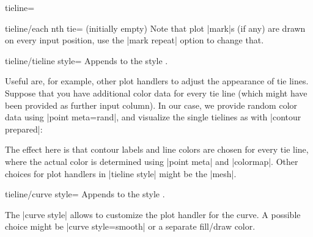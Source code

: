 \begin{plottype}{tieline=}
\begin{pgfplotskey}{tieline/each nth tie= (initially empty)}
	Note that plot |mark|s (if any) are drawn on every input position, use the |mark repeat| option to change that.
\end{pgfplotskey}

\begin{pgfplotskey}{tieline/tieline style=}
	Appends  to the style .

	Useful  are, for example, other plot handlers to adjust the appearance of tie lines. Suppose that you have additional color data for every tie line (which might have been provided as further input column). In our case, we provide random color data using |point meta=rand|, and visualize the single tielines as with |contour prepared|:
\begin{codeexample}[]
\end{codeexample}
	\noindent The effect here is that contour labels and line colors are chosen for every tie line, where the actual color is determined using |point meta| and |colormap|. Other choices for plot handlers in |tieline style| might be the |mesh|.
\end{pgfplotskey}

\begin{pgfplotskey}{tieline/curve style=}
	Appends  to the style .

	The |curve style| allows to customize the plot handler for the curve. A possible choice might be |curve style={smooth}| or a separate fill/draw color.
\end{pgfplotskey}
\end{plottype}
